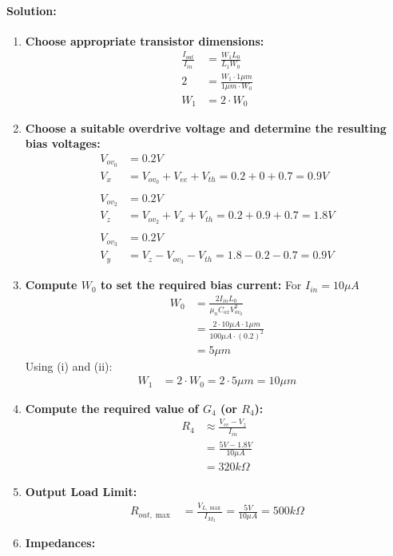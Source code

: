 \paragraph{Solution:}
\begin{enumerate}
  \item \textbf{Choose appropriate transistor dimensions:}
    \begin{align*}
      \frac{I_{out}}{I_{in}} &= \frac{W_1 L_0}{L_1 W_0} \\
      2 &= \frac{W_1 \cdot 1 \mu m}{1 \mu m \cdot W_0} \\
      W_1 &= 2 \cdot W_0
    \end{align*}
  \item \textbf{Choose a suitable overdrive voltage and determine
    the resulting bias voltages:}
    \begin{align*}
      V_{ov_0} &= 0.2 V \\
      V_{x} &= V_{ov_0} + V_{ee} + V_{th} = 0.2 + 0 + 0.7 = 0.9 V \\
      \\
      V_{ov_2} &= 0.2 V \\
      V_{z} &= V_{ov_2} + V_{x} + V_{th} = 0.2 + 0.9 + 0.7 = 1.8 V \\
      \\
      V_{ov_3} &= 0.2 V \\
      V_{y} &= V_{z} - V_{ov_3} - V_{th} = 1.8 - 0.2 - 0.7 = 0.9 V
    \end{align*}
  \item \textbf{Compute $W_0$ to set the required bias current:} For $I_{in} = 10 \mu A$
    \begin{align*}
      W_0 &= \frac{2 I_{in} L_0}{\mu_n C_{ox} V_{ov_0}^2} \\
          &= \frac{2 \cdot 10 \mu A \cdot 1 \mu m}{100 \mu A \cdot (0.2)^2} \\
          &= 5 \mu m
    \end{align*}
    Using (i) and (ii):
    \begin{align*}
      W_1 &= 2 \cdot W_0 = 2 \cdot 5 \mu m = 10 \mu m
    \end{align*}
  \item \textbf{Compute the required value of $G_4$ (or $R_4$):}
    \begin{align*}
      R_4 &\approx \frac{V_{cc} - V_{z}}{I_{in}} \\
          &= \frac{5 V - 1.8 V}{10 \mu A} \\
          &= 320 k\Omega
    \end{align*}
  \item \textbf{Output Load Limit:}
    \begin{align*}
      R_{out, \max} &= \frac{V_{L, \max}}{I_{M_2}} = \frac{5 V}{10 \mu A} = 500 k\Omega
    \end{align*}
  \item \textbf{Impedances:}

\end{enumerate}
